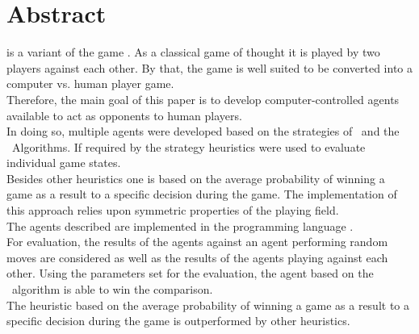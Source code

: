 \chapter*{Abstract}

\mxZitat{\ot} is a variant of the game . As a classical game of thought it is played by two players against each other. By that, the game is well suited to be converted into a computer vs. human player game.
\\Therefore, the main goal of this paper is to develop computer-controlled agents available to act as opponents to human players.
\\In doing so, multiple agents were developed based on the strategies of \abp\ and the \mc\ Algorithms. If required by the strategy heuristics were used to evaluate individual game states.
\\Besides other heuristics one is based on the average probability of winning a game as a result to a specific decision during the game. The implementation of this approach relies upon symmetric properties of the playing field.
\\The agents described are implemented in the programming language .
\\For evaluation, the results of the agents against an agent performing random moves are considered as well as the results of the agents playing against each other. Using the parameters set for the evaluation, the agent based on the \mc\ algorithm is able to win the comparison.
\\The heuristic based on the average probability of winning a game as a result to a specific decision during the game is outperformed by other heuristics.